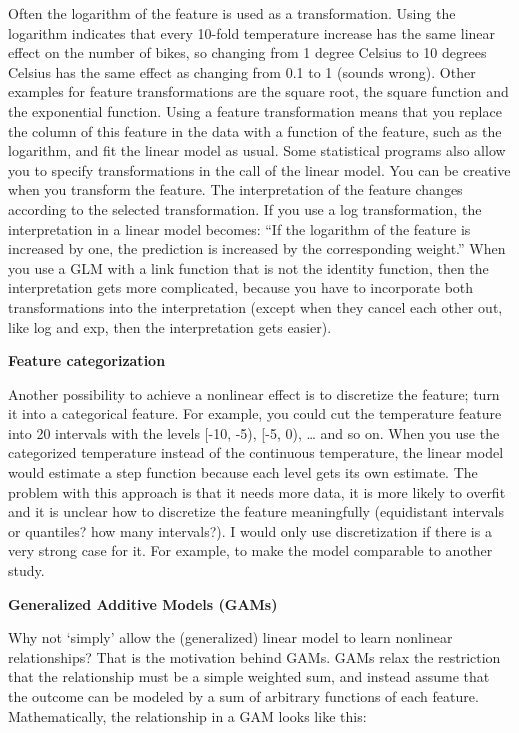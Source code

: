 \documentclass[
  11pt,
]{scrbook}
\begin{document}
Often the logarithm of the feature is used as a transformation.
Using the logarithm indicates that every 10-fold temperature increase has the same linear effect on the number of bikes, so changing from 1 degree Celsius to 10 degrees Celsius has the same effect as changing from 0.1 to 1 (sounds wrong).
Other examples for feature transformations are the square root, the square function and the exponential function.
Using a feature transformation means that you replace the column of this feature in the data with a function of the feature, such as the logarithm, and fit the linear model as usual.
Some statistical programs also allow you to specify transformations in the call of the linear model.
You can be creative when you transform the feature.
The interpretation of the feature changes according to the selected transformation.
If you use a log transformation, the interpretation in a linear model becomes:
``If the logarithm of the feature is increased by one, the prediction is increased by the corresponding weight.''
When you use a GLM with a link function that is not the identity function, then the interpretation gets more complicated, because you have to incorporate both transformations into the interpretation (except when they cancel each other out, like log and exp, then the interpretation gets easier).

\textbf{Feature categorization}

Another possibility to achieve a nonlinear effect is to discretize the feature; turn it into a categorical feature.
For example, you could cut the temperature feature into 20 intervals with the levels {[}-10, -5), {[}-5, 0), \ldots{} and so on.
When you use the categorized temperature instead of the continuous temperature, the linear model would estimate a step function because each level gets its own estimate.
The problem with this approach is that it needs more data, it is more likely to overfit and it is unclear how to discretize the feature meaningfully (equidistant intervals or quantiles? how many intervals?).
I would only use discretization if there is a very strong case for it.
For example, to make the model comparable to another study.

\textbf{Generalized Additive Models (GAMs)}

Why not `simply' allow the (generalized) linear model to learn nonlinear relationships?
That is the motivation behind GAMs.
GAMs relax the restriction that the relationship must be a simple weighted sum, and instead assume that the outcome can be modeled by a sum of arbitrary functions of each feature.
Mathematically, the relationship in a GAM looks like this:
\end{document}

